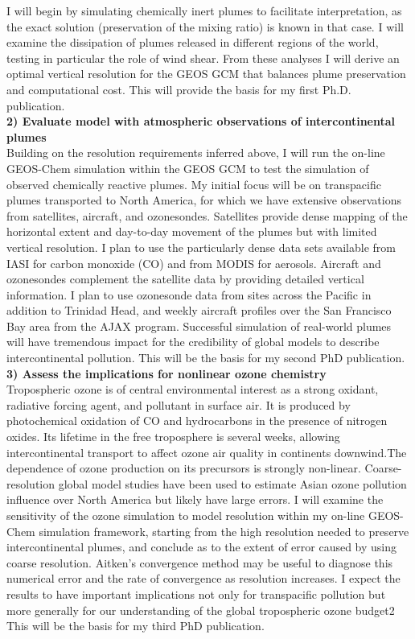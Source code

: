 \documentclass[fleqn, 11pt]{wlscirep}
\begin{document}
I will begin by simulating chemically inert plumes to facilitate interpretation, as the exact solution (preservation of the mixing ratio) is known in that case. I will examine the dissipation of plumes released in different regions of the world, testing in particular the role of wind shear. From these analyses I will derive an optimal vertical resolution for the GEOS GCM that balances plume preservation and computational cost. This will provide the basis for my first Ph.D. publication. 
\\\textbf{2) Evaluate model with atmospheric observations of intercontinental plumes}\\
Building on the resolution requirements inferred above, I will run the on-line GEOS-Chem simulation within the GEOS GCM to test the simulation of observed chemically reactive plumes. My initial focus will be on transpacific plumes transported to North America, for which we have extensive observations from satellites, aircraft, and ozonesondes.  Satellites provide dense mapping of the horizontal extent and day-to-day movement of the plumes but with limited vertical resolution. I plan to use the particularly dense data sets available from IASI for carbon monoxide (CO) and from MODIS for aerosols. Aircraft and ozonesondes complement the satellite data by providing detailed vertical information. I plan to use ozonesonde data from sites across the Pacific in addition to Trinidad Head, and weekly aircraft profiles over the San Francisco Bay area from the AJAX program.\cite{yates} Successful simulation of real-world plumes will have tremendous impact for the credibility of global models to describe intercontinental pollution. This will be the basis for my second PhD publication. \\
 \textbf{3) Assess the implications for nonlinear ozone chemistry}\\
Tropospheric ozone is of central environmental interest as a strong oxidant, radiative forcing agent, and pollutant in surface air. It is produced by photochemical oxidation of CO and hydrocarbons in the presence of nitrogen oxides.\cite{jacob1999} Its lifetime in the free troposphere is several weeks, allowing intercontinental transport to affect ozone air quality in continents downwind.The dependence of ozone production on its precursors is strongly non-linear. Coarse-resolution global model studies have been used to estimate Asian ozone pollution influence over North America  but likely have large errors.\cite{lin} \cite{goldstein} I will examine the sensitivity of the ozone simulation to model resolution within my on-line GEOS-Chem simulation framework, starting from the high resolution needed to preserve intercontinental plumes, and conclude as to the extent of error caused by using coarse resolution. Aitken’s convergence method may be useful to diagnose this numerical error and the rate of convergence as resolution increases. I expect the results to have important implications not only for transpacific pollution but more generally for our understanding of the global tropospheric ozone budget2 This will be the basis for my third PhD publication. \\ \\
\end{document}
